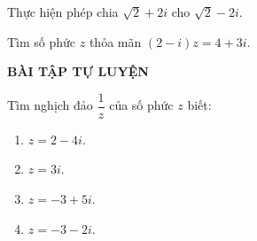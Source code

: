 \begin{vd}%
	Thực hiện phép chia $\sqrt{2}+2i$ cho $\sqrt{2}-2i$.
\end{vd}

\begin{vd}%
	Tìm số phức $z$ thỏa mãn $(2-i)z=4+3i$.
\end{vd}

\begin{center}
	\textbf{BÀI TẬP TỰ LUYỆN}
\end{center}

\begin{bt}%
	Tìm nghịch đảo $\dfrac{1}{z}$ của số phức $z$ biết:
	\begin{multicols}{4}
		\begin{enumerate}
			\item $z=2-4i$.
			\item $z=3i$.
			\item $z=-3+5i$.
			\item $z=-3-2i$.
		\end{enumerate}
	\end{multicols}
\end{bt}

